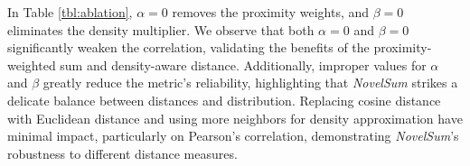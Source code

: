 \begin{table}[ht!]
\centering
{}
\caption{Ablation Study for \textit{NovelSum}.}
\label{tbl:ablation}
\vspace{-2mm}
\end{table}

In Table \ref{tbl:ablation}, $\alpha=0$ removes the proximity weights, and $\beta=0$ eliminates the density multiplier. We observe that both $\alpha=0$ and $\beta=0$ significantly weaken the correlation, validating the benefits of the proximity-weighted sum and density-aware distance. Additionally, improper values for $\alpha$ and $\beta$ greatly reduce the metric's reliability, highlighting that \textit{NovelSum} strikes a delicate balance between distances and distribution. Replacing cosine distance with Euclidean distance and using more neighbors for density approximation have minimal impact, particularly on Pearson's correlation, demonstrating \textit{NovelSum}'s robustness to different distance measures.





